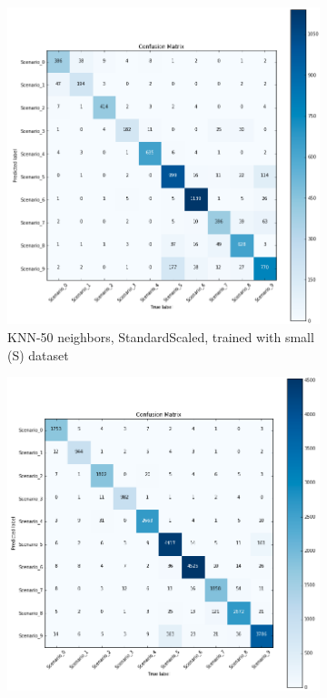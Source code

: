 \begin{figure}[!htb]
    \captionsetup[subfigure]{justification=centering}
    \centering
    \begin{subfigure}[htb]{0.49\textwidth}
        \centering
        \includegraphics[width=\linewidth]{figures/knn_scaled_S_50}
        \caption{KNN-50 neighbors, StandardScaled, trained with small (S) dataset}
        \label{fig:knn_2}
    \end{subfigure}
    \begin{subfigure}[htb]{0.49\textwidth}
        \centering
        \includegraphics[width=\linewidth]{figures/knn_unscaled_XL_4}

\end{subfigure}
\end{figure}
